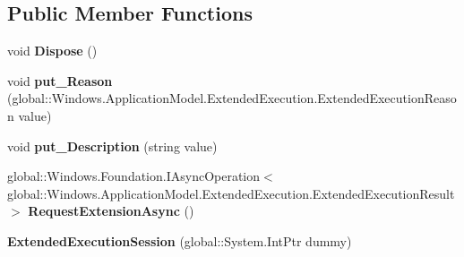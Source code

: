 \subsection*{Public Member Functions}
\begin{DoxyCompactItemize}
\item 
\mbox{\label{class_windows_1_1_application_model_1_1_extended_execution_1_1_extended_execution_session_a9a9b5dca28960f42d43054fca55a63f0}} 
void {\bfseries Dispose} ()
\item 
\mbox{\label{class_windows_1_1_application_model_1_1_extended_execution_1_1_extended_execution_session_aa358d0b0e3c44d87b444499323cd693e}} 
void {\bfseries put\+\_\+\+Reason} (global\+::\+Windows.\+Application\+Model.\+Extended\+Execution.\+Extended\+Execution\+Reason value)
\item 
\mbox{\label{class_windows_1_1_application_model_1_1_extended_execution_1_1_extended_execution_session_af499c01b24316417ab837241cbc579f3}} 
void {\bfseries put\+\_\+\+Description} (string value)
\item 
\mbox{\label{class_windows_1_1_application_model_1_1_extended_execution_1_1_extended_execution_session_adc9b60c4fdd1c687858d54fff5085a7e}} 
global\+::\+Windows.\+Foundation.\+I\+Async\+Operation$<$ global\+::\+Windows.\+Application\+Model.\+Extended\+Execution.\+Extended\+Execution\+Result $>$ {\bfseries Request\+Extension\+Async} ()
\item 
\mbox{\label{class_windows_1_1_application_model_1_1_extended_execution_1_1_extended_execution_session_a46bcb431911d1811af8851af151075c4}} 
{\bfseries Extended\+Execution\+Session} (global\+::\+System.\+Int\+Ptr dummy)
\item 
\mbox{\label{class_windows_1_1_application_model_1_1_extended_execution_1_1_extended_execution_session_a9a9b5dca28960f42d43054fca55a63f0}} 

\end{DoxyCompactItemize}
